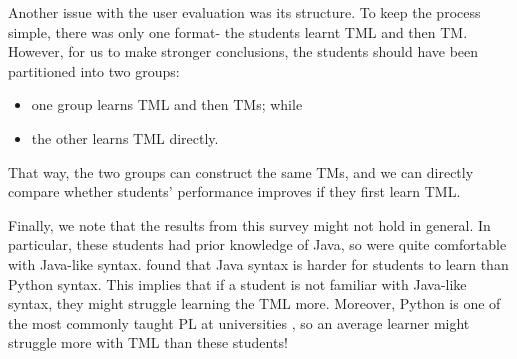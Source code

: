 Another issue with the user evaluation was its structure. To keep the process simple, there was only one format- the students learnt TML and then TM. However, for us to make stronger conclusions, the students should have been partitioned into two groups:
\begin{itemize}
    \item one group learns TML and then TMs; while
    \item the other learns TML directly.
\end{itemize}
That way, the two groups can construct the same TMs, and we can directly compare whether students' performance improves if they first learn TML.

Finally, we note that the results from this survey might not hold in general. In particular, these students had prior knowledge of Java, so were quite comfortable with Java-like syntax. \citet{lo2015programming} found that Java syntax is harder for students to learn than Python syntax. This implies that if a student is not familiar with Java-like syntax, they might struggle learning the TML more. Moreover, Python is one of the most commonly taught PL at universities \citep{meszarosova2015python}, so an average learner might struggle more with TML than these students!
